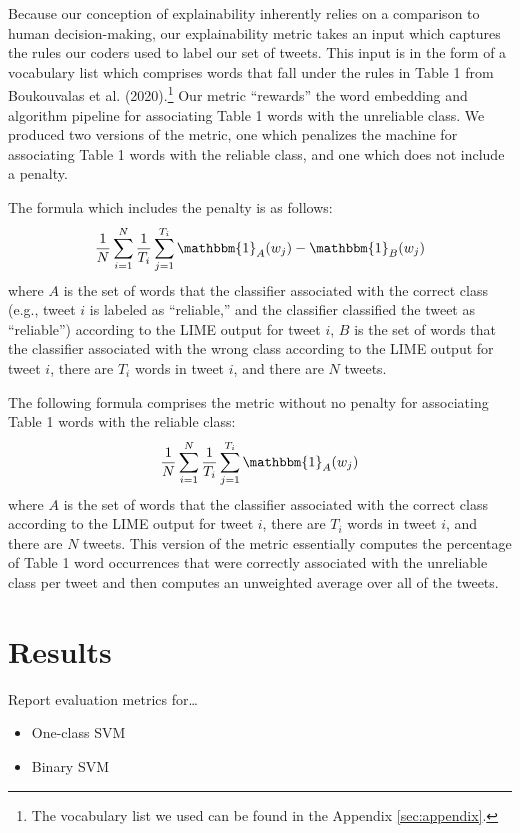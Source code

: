 \documentclass{article}
\begin{document}
Because our conception of explainability inherently relies on a
comparison to human decision-making, our explainability metric takes an
input which captures the rules our coders used to label our set of
tweets. This input is in the form of a vocabulary list which comprises
words that fall under the rules in Table 1 from Boukouvalas et al.
(2020).\footnote{The vocabulary list we used can be found in the
  Appendix \ref{sec:appendix}.} Our metric ``rewards'' the word
embedding and algorithm pipeline for associating Table 1 words with the
unreliable class. We produced two versions of the metric, one which
penalizes the machine for associating Table 1 words with the reliable
class, and one which does not include a penalty.

The formula which includes the penalty is as follows: \[
\frac{1}{N} \sum_{i=1}^{N} \frac{1}{T_i} \sum_{j=1}^{T_i} \mathbbm{1}_A(w_j) - \mathbbm{1}_B(w_j)
\] where \(A\) is the set of words that the classifier associated with
the correct class (e.g., tweet \(i\) is labeled as ``reliable,'' and the
classifier classified the tweet as ``reliable'') according to the LIME
output for tweet \(i\), \(B\) is the set of words that the classifier
associated with the wrong class according to the LIME output for tweet
\(i\), there are \(T_i\) words in tweet \(i\), and there are \(N\)
tweets.

The following formula comprises the metric without no penalty for
associating Table 1 words with the reliable class: \[
\frac{1}{N} \sum_{i=1}^{N} \frac{1}{T_i} \sum_{j=1}^{T_i} \mathbbm{1}_A(w_j)
\] where \(A\) is the set of words that the classifier associated with
the correct class according to the LIME output for tweet \(i\), there
are \(T_i\) words in tweet \(i\), and there are \(N\) tweets. This
version of the metric essentially computes the percentage of Table 1
word occurrences that were correctly associated with the unreliable
class per tweet and then computes an unweighted average over all of the
tweets.

\hypertarget{results}{%
\section{Results}\label{results}}

\label{sec:results} Report evaluation metrics for\ldots{}

\begin{itemize}
\tightlist
\item
  One-class SVM
\item
  Binary SVM
\end{itemize}
\end{document}
